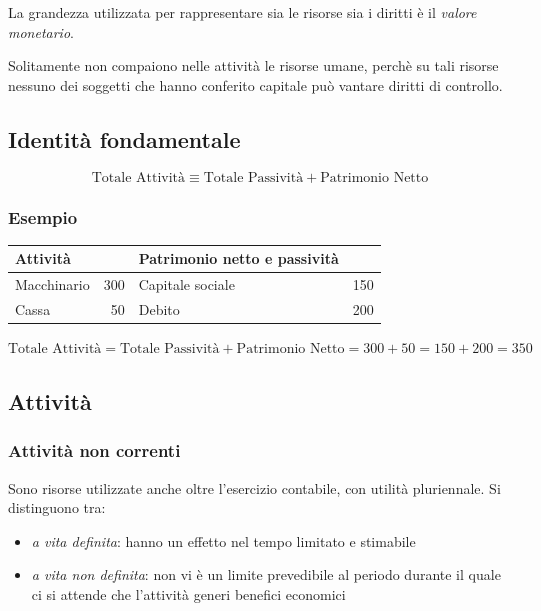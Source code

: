 \documentclass[10pt,a4paper,fleqn,oneside]{book}
\begin{document}
La grandezza utilizzata per rappresentare sia le risorse sia i diritti è il \emph{valore monetario}.

Solitamente non compaiono nelle attività le risorse umane, perchè su tali risorse
nessuno dei soggetti che hanno conferito capitale può vantare diritti di controllo.

\subsection{Identità fondamentale}
\begin{equation*}
    \text{Totale Attività} \equiv \text{Totale Passività} + \text{Patrimonio Netto}
\end{equation*}

\subsubsection{Esempio}
\begin{tabular}{| l r | l r |}
    \hline
    \textbf{Attività} & & \textbf{Patrimonio netto e passività} & \\
    \hline
    Macchinario & 300 & Capitale sociale & 150 \\
    Cassa       & 50  & Debito           & 200 \\ 
    \hline 
\end{tabular}
\newline
\newline
$\text{Totale Attività} = \text{Totale Passività} + \text{Patrimonio Netto} = 300 + 50 = 150 + 200 = 350$

\subsection{Attività}

\subsubsection{Attività non correnti}
Sono risorse utilizzate anche oltre l’esercizio contabile, con utilità pluriennale. Si distinguono tra:
\begin{itemize}
    \item \emph{a vita definita}: hanno un effetto nel tempo limitato e stimabile
    \item \emph{a vita non definita}: non vi è un limite prevedibile al periodo
    durante il quale ci si attende che l’attività generi benefici economici
\end{itemize}
\end{document}
